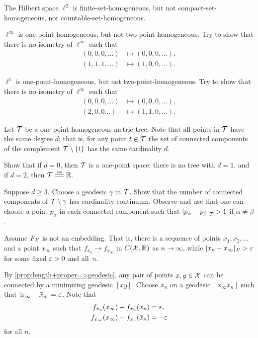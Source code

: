 The Hilbert space $\ell^2$ is finite-set-homogeneous, but not compact-set-homogeneous, nor countable-set-homogeneous.

$\ell^\infty$ is one-point-homogeneous, but not two-point-homogeneous.
Try to show that there is no isometry of $\ell^\infty$ such that
\begin{align*}
(0,0,0,\dots)&\mapsto (0,0,0,\dots),
\\
(1,1,1,\dots)&\mapsto (1,0,0,\dots).
\end{align*}

$\ell^1$ is one-point-homogeneous, but not two-point-homogeneous.
Try to show that there is no isometry of $\ell^\infty$ such that
\begin{align*}
(0,0,0,\dots)&\mapsto (0,0,0,\dots),
\\
(2,0,0\dots)&\mapsto (1,1,0,\dots).
\end{align*}

Let $\mathcal{T}$ be a one-point-homogeneous metric tree.
Note that all points in $\mathcal{T}$ have the same degree $d$;
that is, for any point $t\in \mathcal{T}$ the set of connected components of the complement $\mathcal{T}\setminus\{t\}$ has the same cardinality $d$.

Show that if $d=0$, then $\mathcal{T}$ is a one-point space;
there is no tree with $d=1$,
and if $d=2$, then $\spc{T}\iso\RR$.

Suppose $d\ge 3$.
Choose a geodesic $\gamma$ in $\mathcal{T}$.
Show that the number of connected components of $\mathcal{T}\setminus\gamma$ has cardinality continuum.
Observe and use that one can choose a point $p_\alpha$ in each connected component such that $\dist{p_\alpha}{p_\beta}{\spc{T}}>1$ if $\alpha\ne\beta$.

Assume $F_{\mathcal{X}}$ is not an embedding.
That is, there is a sequence of points $x_1,x_2,\dots$ 
and a point $x_\infty$ such that $f_{x_n}\to f_{x_\infty}$ in $C(\mathcal{X},\mathbb{R})$
as $n\to \infty$, 
while $|x_n-x_\infty|_{\mathcal{X}}>\varepsilon$ 
for some fixed $\varepsilon>0$ and all~$n$.

By \ref{prop:length+proper=>geodesic}, any pair of points $x,y\in \mathcal{X}$ can be connected by a minimizing geodesic $[xy]$.
Choose $\bar x_n$ on a geodesic $[x_\infty x_n]$ such that $|x_\infty-\bar x_n|=\varepsilon$.
Note that 
\begin{align*}
f_{x_n}(x_\infty)-f_{x_n}(\bar x_n)&=\varepsilon,
\\
f_{x_\infty}(x_\infty)-f_{x_n}(\bar x_n)&=-\varepsilon
\end{align*}
for all $n$.


